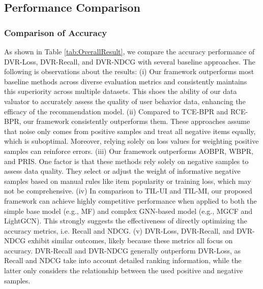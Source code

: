 \subsection{Performance Comparison}
\subsubsection{Comparison of Accuracy}
As shown in Table \ref{tab:OverallResult}, we compare the accuracy performance of DVR-Loss, DVR-Recall, and DVR-NDCG with several baseline approaches. The following is observations about the results: (i) Our framework outperforms most baseline methods across diverse evaluation metrics and consistently maintains this superiority across multiple datasets. This shoes the ability of our data valuator to accurately assess the quality of user behavior data, enhancing the efficacy of the recommendation model.
(ii) Compared to TCE-BPR and RCE-BPR, our framework consistently outperforms them. These approaches assume that noise only comes from positive samples and treat all negative items equally, which is suboptimal. Moreover, relying solely on loss values for weighting positive samples can reinforce errors.
(iii) Our framework outperforms AOBPR, WBPR, and PRIS. One factor is that these methods rely solely on negative samples to assess data quality. They select or adjust the weight of informative negative samples based on manual rules like item popularity or training loss, which may not be comprehensive.
(iv) In comparison to TIL-UI and TIL-MI, our proposed framework can achieve highly competitive performance when applied to both the simple base model (e.g., MF) and complex GNN-based model (e.g., MGCF and LightGCN). This strongly suggests the effectiveness of directly optimizing the accuracy metrics, i.e. Recall and NDCG.
(v) DVR-Loss, DVR-Recall, and DVR-NDCG exhibit similar outcomes, likely because these metrics all focus on accuracy. DVR-Recall and DVR-NDCG generally outperform DVR-Loss, as Recall and NDCG take into account detailed ranking information, while the latter only considers the relationship between the used positive and negative samples.


